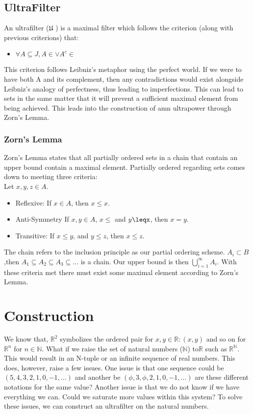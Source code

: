 \documentclass[12pt]{report}
\newcommand{\R}{\mathbb{R}}
\newcommand{\N}{\mathbb{N}}
\begin{document}
\section*{UltraFilter}
An ultrafilter ($\mathfrak{U}$ ) is a maximal filter which follows the criterion (along with previous criterions) that:
\begin{itemize}
    \item $\forall A \subseteq J , A \in $$ \lor A^c \in $$ $
\end{itemize}
This criterion follows Leibniz's metaphor using the perfect world.
If we were to have both A and its complement, then any contradictions would exist alongside Leibniz's analogy of perfectness, thus leading to imperfections.
This can lead to sets in the same matter that it will prevent a sufficient maximal element from being achieved.
This leads into the construction of amn ultrapower through Zorn's Lemma.
\subsection*{Zorn's Lemma}
Zorn's Lemma states that all partially ordered sets in a chain that contain an upper bound contain a maximal element.
Partially ordered regarding sets comes down to meeting three criteria:\\
Let $x,y,z \in A$.
\begin{itemize}
    \item Reflexive: If $x \in A$, then $x\leq x$.
    \item Anti-Symmetry If $x,y \in A$, $x\leq$ and $y\leqx$, then $x=y$.
    \item Transitive: If $x \leq y$, and $y \leq z$, then $x \leq z$.
\end{itemize}
The chain refers to the inclusion principle as our partial ordering scheme.
$A_i \subset B$ ,then $A_1\subseteq A_2\subseteq A_3\subseteq\ldots$ is a chain.
Our upper bound is then $\bigcup_{i=1}^{\infty}A_i$.
With these criteria met there must exist some maximal element according to Zorn's Lemma.

\chapter{Construction}
We know that, $\R^2 $ symbolizes the ordered pair for $x, y \in \R: (x, y)$ and so on for $\R^n$ for $n \in \N$.
What if we raise the set of natural numbers ($\N$) to$ \R$ such as $\R^{\N}$.
This would result in an N-tuple or an infinite sequence of real numbers.
This does, however, raise a few issues.
One issue is that one sequence could be $(5,4,3,2,1,0,-1,\ldots)$ and another be $(\phi,3,\phi, 2,1,0,-1,\ldots)$ are these different notations for the same value?
Another issue is that we do not know if we have everything we can.
Could we saturate more values within this system?
To solve these issues, we can construct an ultrafilter on the natural numbers.\par
\end{document}
